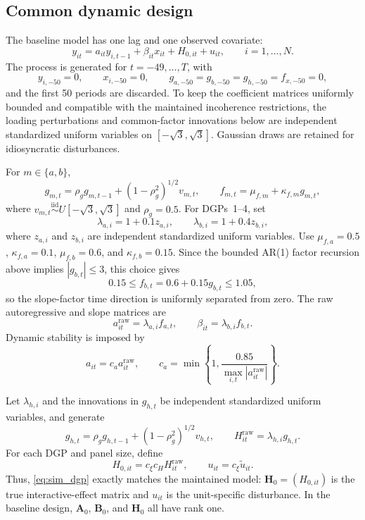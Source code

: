 \documentclass[11pt]{article}
\numberwithin{equation}{section}
\theoremstyle{remark}
\newcommand{\bA}{\bm A}
\newcommand{\bB}{\bm B}
\newcommand{\bH}{\bm H}
\begin{document}
\subsection{Common dynamic design}

The baseline model has one lag and one observed covariate:
\begin{equation}
\label{eq:sim_dgp}
y_{it}
=
a_{it}y_{i,t-1}
+
\beta_{it}x_{it}
+
H_{0,it}
+
u_{it},
\qquad
i=1,\ldots,N.
\end{equation}
The process is generated for $t=-49,\ldots,T$, with
$$
y_{i,-50}=0,
\qquad
x_{i,-50}=0,
\qquad
g_{a,-50}=g_{b,-50}=g_{h,-50}=f_{x,-50}=0,
$$
and the first 50 periods are discarded. To keep the coefficient matrices uniformly bounded and compatible with the maintained incoherence restrictions, the loading perturbations and common-factor innovations below are independent standardized uniform variables on $[-\sqrt 3,\sqrt 3]$. Gaussian draws are retained for idiosyncratic disturbances.

For $m\in\{a,b\}$,
$$
g_{m,t}
=
\rho_g g_{m,t-1}
+
(1-\rho_g^2)^{1/2}v_{m,t},
\qquad
f_{m,t}=\mu_{f,m}+\kappa_{f,m}g_{m,t},
$$
where $v_{m,t}\stackrel{\mathrm{iid}}{\sim}U[-\sqrt 3,\sqrt 3]$ and $\rho_g=0.5$. For DGPs~1--4, set
$$
\lambda_{a,i}=1+0.1z_{a,i},
\qquad
\lambda_{b,i}=1+0.4z_{b,i},
$$
where $z_{a,i}$ and $z_{b,i}$ are independent standardized uniform variables. Use $\mu_{f,a}=0.5$, $\kappa_{f,a}=0.1$, $\mu_{f,b}=0.6$, and $\kappa_{f,b}=0.15$. Since the bounded AR(1) factor recursion above implies $|g_{b,t}|\le 3$, this choice gives
$$
0.15
\le
f_{b,t}
=
0.6+0.15g_{b,t}
\le
1.05,
$$
so the slope-factor time direction is uniformly separated from zero. The raw autoregressive and slope matrices are
$$
a_{it}^{\mathrm{raw}}=\lambda_{a,i}f_{a,t},
\qquad
\beta_{it}=\lambda_{b,i}f_{b,t}.
$$
Dynamic stability is imposed by
$$
a_{it}=c_a a_{it}^{\mathrm{raw}},
\qquad
c_a=\min\left\{1,\frac{0.85}{\max_{i,t}|a_{it}^{\mathrm{raw}}|}\right\}.
$$

Let $\lambda_{h,i}$ and the innovations in $g_{h,t}$ be independent standardized uniform variables, and generate
$$
g_{h,t}=\rho_g g_{h,t-1}+(1-\rho_g^2)^{1/2}v_{h,t},
\qquad
H_{it}^{\mathrm{raw}}=\lambda_{h,i}g_{h,t}.
$$
For each DGP and panel size, define
$$
H_{0,it}=c_\xi c_H H_{it}^{\mathrm{raw}},
\qquad
u_{it}=c_\xi\widetilde u_{it}.
$$
Thus, \eqref{eq:sim_dgp} exactly matches the maintained model: $\bH_0=(H_{0,it})$ is the true interactive-effect matrix and $u_{it}$ is the unit-specific disturbance. In the baseline design, $\bA_0$, $\bB_0$, and $\bH_0$ all have rank one.
\end{document}
